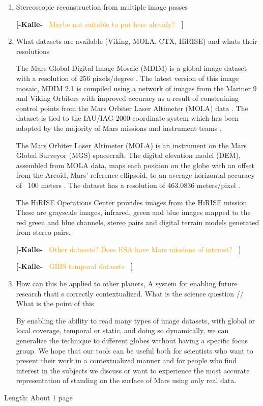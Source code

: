\documentclass[journal]{vgtc}                %
\newcommand{\kallecomment}[1]{\textbf{[-Kalle-~}
    \textcolor{orange}{#1}
    \textbf{~]}}
\begin{document}
\begin{enumerate}
\item Stereoscopic reconstruction from multiple image passes

\kallecomment{Maybe not suitable to put here already?}

\item What datasets are available (Viking, MOLA, CTX, HiRISE) and whats their resolutions

The Mars Global Digital Image Mosaic (MDIM) is a global image dataset with a resolution of 256 pixels/degree \cite{MDIM2.1_web}.
The latest version of this image mosaic, MDIM 2.1 is compiled using a network of images from the Mariner 9 and Viking Orbiters with improved accuracy as a result of constraining control points from the Mars Orbiter Laser Altimeter (MOLA) data \cite{MDIM2.1}.
The dataset is tied to the IAU/IAG 2000 coordinate system which has been adopted by the majority of Mars missions and instrument teams \cite{MDIM2.1}.

The Mars Orbiter Laser Altimeter (MOLA) is an instrument on the Mars Global Surveyor (MGS) spacecraft.
The digital elevation model (DEM), assembled from MOLA data, maps each position on the globe with an offset from the Areoid, Mars' reference ellipsoid, to an average horizontal accuracy of ~100 meters \cite{MOLA}. The dataset has a resolution of 463.0836 meters/pixel \cite{MOLA}.

The HiRISE Operations Center provides images from the HiRISE mission. These are grayscale images, infrared, green and blue images mapped to the red green and blue channels, stereo pairs and digital terrain models generated from stereo pairs.

\kallecomment{Other datasets? Does ESA have Mars missions of interest?}

\kallecomment{GIBS temporal datasets}

\item How can this be applied to other planets, A system for enabling future research thati s correctly contextualized. What is the science question // What is the point of this

By enabling the ability to read many types of image datasets, with global or local coverage, temporal or static, and doing so dynamically, we can generalize the technique to different globes without having a specific focus group.
We hope that our tools can be useful both for scientists who want to present their work in a contextualized manner and for people who find interest in the subjects we discuss or want to experience the most accurate representation of standing on the surface of Mars using only real data.

\end{enumerate}
Length: About 1 page
\end{document}
